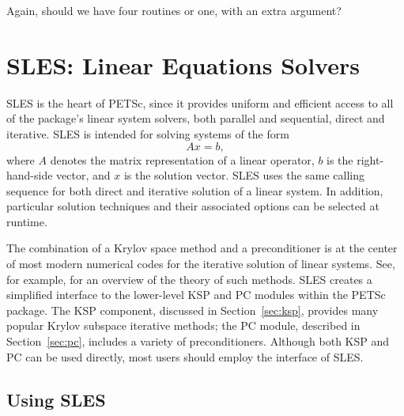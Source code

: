 \begin{design}
Again, should we have four routines or one, with an extra argument?
\end{design}

\chapter{SLES: Linear Equations Solvers} 
\label{sec:sles}

SLES is the heart of PETSc, since it provides uniform and efficient access 
to all of the package's linear system solvers, both parallel and sequential,
direct and iterative.
SLES is intended for solving systems of the form
\begin{equation}
   A x = b,
\label{eq:Ax=b}
\end{equation}
where $A$ denotes the matrix representation of a linear operator, $b$
is the right-hand-side vector, and $x$ is the solution vector.  SLES
uses the same calling sequence for both direct and iterative solution
of a linear system.  In addition, particular solution techniques and
their associated options can be selected at runtime.

The combination of a Krylov space method and a preconditioner is at
the center of most modern numerical codes for the iterative solution of
linear systems.  See, for example, \cite{fgn} for an overview of the theory
of such methods.  SLES creates a simplified interface to the
lower-level KSP and PC modules within the PETSc package.  The KSP component, 
discussed in
Section~\ref{sec:ksp}, provides many popular Krylov
 subspace iterative methods;
the PC module, described in Section~\ref{sec:pc}, includes a
variety of preconditioners.  Although both  KSP and PC can be used
directly, most users should employ the interface of SLES.

\section{Using SLES} 
\label{sec:usingsles}

